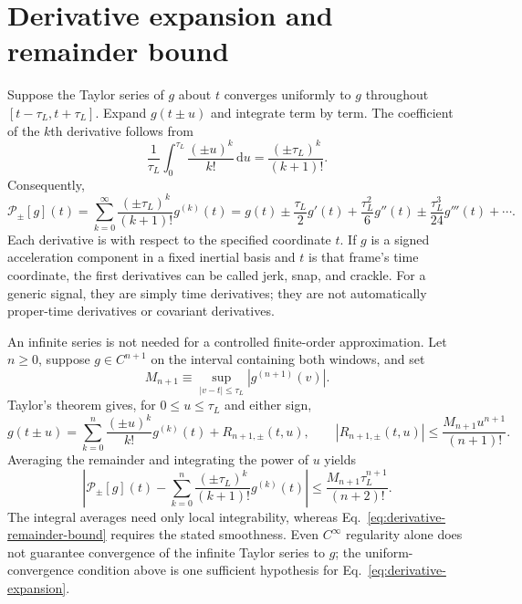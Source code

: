 \documentclass[12pt]{article}
\begin{document}
\section{Derivative expansion and remainder bound}\label{sec:derivative-expansion}

Suppose the Taylor series of $g$ about $t$ converges uniformly to $g$ throughout $[t-\tau_L,t+\tau_L]$. Expand $g(t\pm u)$ and integrate term by term. The coefficient of the $k$th derivative follows from
\begin{equation}
  \frac{1}{\tau_L}\int_0^{\tau_L}\frac{(\pm u)^k}{k!}\,\mathrm{d}u
  =\frac{(\pm\tau_L)^k}{(k+1)!}.
\end{equation}
Consequently,
\begin{equation}
  \mathcal{P}_{\pm}[g](t)
  =\sum_{k=0}^{\infty}\frac{(\pm\tau_L)^k}{(k+1)!}g^{(k)}(t)
  =g(t)\pm\frac{\tau_L}{2}g'(t)
   +\frac{\tau_L^2}{6}g''(t)
   \pm\frac{\tau_L^3}{24}g'''(t)+\cdots.
  \label{eq:derivative-expansion}
\end{equation}
Each derivative is with respect to the specified coordinate $t$. If $g$ is a signed acceleration component in a fixed inertial basis and $t$ is that frame's time coordinate, the first derivatives can be called jerk, snap, and crackle. For a generic signal, they are simply time derivatives; they are not automatically proper-time derivatives or covariant derivatives.

An infinite series is not needed for a controlled finite-order approximation. Let $n\geq0$, suppose $g\in C^{n+1}$ on the interval containing both windows, and set
\begin{equation}
  M_{n+1}\equiv\sup_{|v-t|\leq\tau_L}|g^{(n+1)}(v)|.
  \label{eq:derivative-bound-definition}
\end{equation}
Taylor's theorem gives, for $0\leq u\leq\tau_L$ and either sign,
\begin{equation}
  g(t\pm u)
  =\sum_{k=0}^{n}\frac{(\pm u)^k}{k!}g^{(k)}(t)+R_{n+1,\pm}(t,u),
  \qquad
  |R_{n+1,\pm}(t,u)|\leq\frac{M_{n+1}u^{n+1}}{(n+1)!}.
  \label{eq:taylor-remainder-pointwise}
\end{equation}
Averaging the remainder and integrating the power of $u$ yields
\begin{equation}
  \left|
  \mathcal{P}_{\pm}[g](t)
  -\sum_{k=0}^{n}\frac{(\pm\tau_L)^k}{(k+1)!}g^{(k)}(t)
  \right|
  \leq\frac{M_{n+1}\tau_L^{n+1}}{(n+2)!}.
  \label{eq:derivative-remainder-bound}
\end{equation}
The integral averages need only local integrability, whereas Eq.~\eqref{eq:derivative-remainder-bound} requires the stated smoothness. Even $C^{\infty}$ regularity alone does not guarantee convergence of the infinite Taylor series to $g$; the uniform-convergence condition above is one sufficient hypothesis for Eq.~\eqref{eq:derivative-expansion}.
\end{document}
